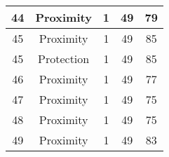 \documentclass[results.tex]{subfiles}
\begin{document}
\begin{center}
\begin{tabular}{| c || c | c | c | c |}
            \hline
            44                      & Proximity                    & 1                      & 49                      & 79                   \\
            \hline
            45                      & Proximity                    & 1                      & 49                      & 85                   \\
            \hline
            45                      & Protection                   & 1                      & 49                      & 85                   \\
            \hline
            46                      & Proximity                    & 1                      & 49                      & 77                   \\
            \hline
            47                      & Proximity                    & 1                      & 49                      & 75                   \\
            \hline
            48                      & Proximity                    & 1                      & 49                      & 75                   \\
            \hline
            49                      & Proximity                    & 1                      & 49                      & 83                   \\
            \hline
        \end{tabular}
    \end{center}
\end{document}
